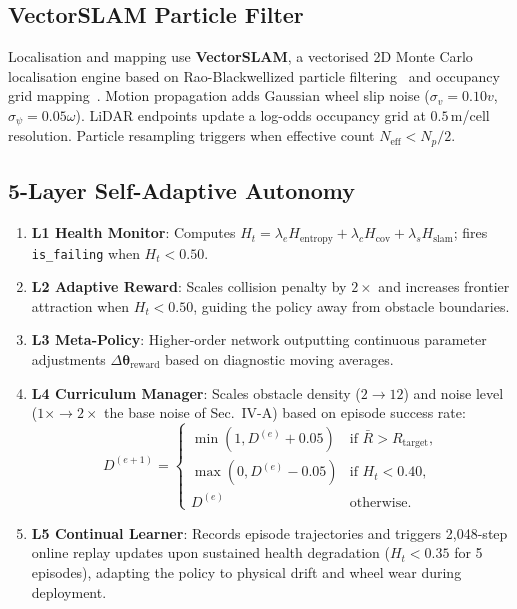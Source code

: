 \documentclass[conference]{IEEEtran}
\begin{document}
\subsection{VectorSLAM Particle Filter}
Localisation and mapping use \textbf{VectorSLAM}, a vectorised 2D Monte Carlo localisation engine based on Rao-Blackwellized particle filtering~\cite{grisetti2007} and occupancy grid mapping~\cite{elfes1989}.
Motion propagation adds Gaussian wheel slip noise ($\sigma_v\!=\!0.10 v$, $\sigma_\psi\!=\!0.05\omega$).
LiDAR endpoints update a log-odds occupancy grid at $0.5$\,m/cell resolution.
Particle resampling triggers when effective count $N_{\text{eff}} < N_p/2$.

\subsection{5-Layer Self-Adaptive Autonomy}
\begin{enumerate}
    \item \textbf{L1 Health Monitor}: Computes $H_t = \lambda_e H_{\text{entropy}} + \lambda_c H_{\text{cov}} + \lambda_s H_{\text{slam}}$; fires \texttt{is\_failing} when $H_t < 0.50$.
    \item \textbf{L2 Adaptive Reward}: Scales collision penalty by $2\times$ and increases frontier attraction when $H_t < 0.50$, guiding the policy away from obstacle boundaries.
    \item \textbf{L3 Meta-Policy}: Higher-order network outputting continuous parameter adjustments $\Delta\boldsymbol{\theta}_{\text{reward}}$ based on diagnostic moving averages.
    \item \textbf{L4 Curriculum Manager}: Scales obstacle density ($2 \to 12$) and noise level ($1\times \to 2\times$ the base noise of Sec.~IV-A) based on episode success rate:
    \begin{equation}
    \label{eq:curriculum}
    D^{(e+1)} = \begin{cases}
    \min(1, D^{(e)}\!+\!0.05) & \text{if } \bar{R} > R_{\text{target}}, \\
    \max(0, D^{(e)}\!-\!0.05) & \text{if } H_t < 0.40, \\
    D^{(e)} & \text{otherwise}.
    \end{cases}
    \end{equation}
    \item \textbf{L5 Continual Learner}: Records episode trajectories and triggers 2{,}048-step online replay updates upon sustained health degradation ($H_t < 0.35$ for 5 episodes), adapting the policy to physical drift and wheel wear during deployment.
\end{enumerate}
\end{document}
